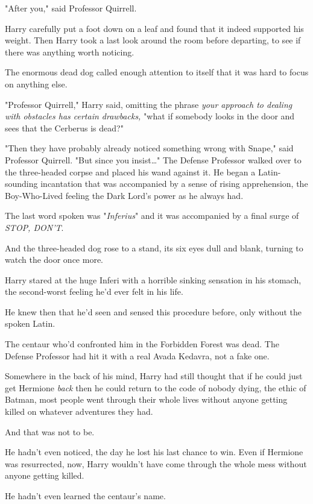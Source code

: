 "After you," said Professor Quirrell.

Harry carefully put a foot down on a leaf and found that it indeed supported 
his weight. Then Harry took a last look around the room before departing, to 
see if there was anything worth noticing.

The enormous dead dog called enough attention to itself that it was hard to 
focus on anything else.

"Professor Quirrell," Harry said, omitting the phrase \emph{your approach to 
dealing with obstacles has certain drawbacks,} "what if somebody looks in the 
door and sees that the Cerberus is dead?"

"Then they have probably already noticed something wrong with Snape," said 
Professor Quirrell. "But since you insist{\ldots}" The Defense Professor walked 
over to the three-headed corpse and placed his wand against it. He began a 
Latin-sounding incantation that was accompanied by a sense of rising 
apprehension, the Boy-Who-Lived feeling the Dark Lord's power as he always had.

The last word spoken was "\emph{Inferius}" and it was accompanied by a final 
surge of \emph{STOP, DON'T}.

And the three-headed dog rose to a stand, its six eyes dull and blank, turning 
to watch the door once more.

Harry stared at the huge Inferi with a horrible sinking sensation in his 
stomach, the second-worst feeling he'd ever felt in his life.

He knew then that he'd seen and sensed this procedure before, only without the 
spoken Latin.

The centaur who'd confronted him in the Forbidden Forest was dead. The Defense 
Professor had hit it with a real Avada Kedavra, not a fake one.

Somewhere in the back of his mind, Harry had still thought that if he could 
just get Hermione \emph{back} then he could return to the code of nobody dying, 
the ethic of Batman, most people went through their whole lives without anyone 
getting killed on whatever adventures they had.

And that was not to be.

He hadn't even noticed, the day he lost his last chance to win. Even if 
Hermione was resurrected, now, Harry wouldn't have come through the whole mess 
without anyone getting killed.

He hadn't even learned the centaur's name.

